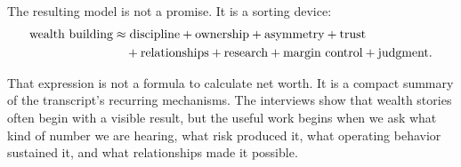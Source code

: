 The resulting model is not a promise. It is a sorting device:
\begin{align}
\hbox{wealth building}
&\approx
\hbox{discipline}
+\hbox{ownership}
+\hbox{asymmetry}
+\hbox{trust} \notag\\
&\quad
+\hbox{relationships}
+\hbox{research}
+\hbox{margin control}
+\hbox{judgment}.
\end{align}

That expression is not a formula to calculate net worth. It is a compact summary of the transcript's recurring mechanisms. The interviews show that wealth stories often begin with a visible result, but the useful work begins when we ask what kind of number we are hearing, what risk produced it, what operating behavior sustained it, and what relationships made it possible.